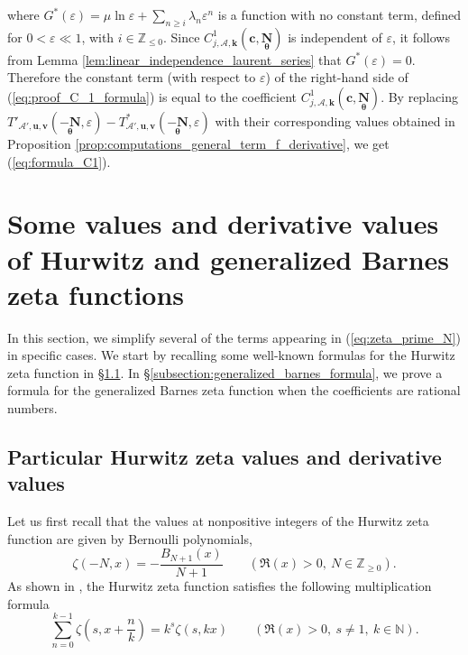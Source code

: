 \documentclass[a4paper]{amsart}
\theoremstyle{remark}
\theoremstyle{definition}
\begin{document}
where $G^*(\varepsilon)=\mu \ln \varepsilon + \sum_{n \geq i} \lambda_n \varepsilon^n$ is a function with no constant term, defined for $0<\varepsilon \ll 1$, with $i \in \mathbb{Z}_{\leq 0}$. Since $C^1_{j,\mathcal{A},\mathbf{k}}(\mathbf{c},\underset{\bm{\theta}}{\mathbf{N}})$ is independent of $\varepsilon$, it follows from Lemma \ref{lem:linear_independence_laurent_series} that $G^*(\varepsilon)=0$. Therefore the constant term (with respect to $\varepsilon$) of the right-hand side of (\ref{eq:proof_C_1_formula}) is equal to the coefficient $C^1_{j,\mathcal{A},\mathbf{k}}(\mathbf{c},\underset{\bm{\theta}}{\mathbf{N}})$. By replacing $T'_{\mathcal{A}',\mathbf{u},\mathbf{v}}(\underset{\bm{\theta}}{-\mathbf{N}},\varepsilon)-T^*_{\mathcal{A}',\mathbf{u},\mathbf{v}}(\underset{\bm{\theta}}{-\mathbf{N}},\varepsilon)$ with their corresponding values obtained in Proposition \ref{prop:computations_general_term_f_derivative}, we get (\ref{eq:formula_C1}).

\section{Some values and derivative values of Hurwitz and generalized Barnes zeta functions}
\label{section:values_hurwitz_barnes}

In this section, we simplify several of the terms appearing in (\ref{eq:zeta_prime_N}) in specific cases. We start by recalling some well-known formulas for the Hurwitz zeta function in §\ref{subsection:values_particular_hurwitz}. In §\ref{subsection:generalized_barnes_formula}, we prove a formula for the generalized Barnes zeta function when the coefficients are rational numbers.

\subsection{Particular Hurwitz zeta values and derivative values}
\label{subsection:values_particular_hurwitz}

Let us first recall that the values at nonpositive integers of the Hurwitz zeta function are given by Bernoulli polynomials,
$$ \zeta(-N,x)=-\frac{B_{N+1}(x)}{N+1} \qquad (\Re(x)>0, \ N \in \mathbb{Z}_{\geq 0}). $$
As shown in \cite[Formula (12)]{miller1998derivhurwitz}, the Hurwitz zeta function satisfies the following multiplication formula
\begin{equation}
    \sum_{n=0}^{k-1}\zeta\left(s,x+\frac{n}{k}\right) = k^s \zeta(s,kx) \qquad (\Re(x)>0, \ s \neq 1, \ k \in \mathbb{N}). \label{eq:multiplication_formula}
\end{equation}
\end{document}
